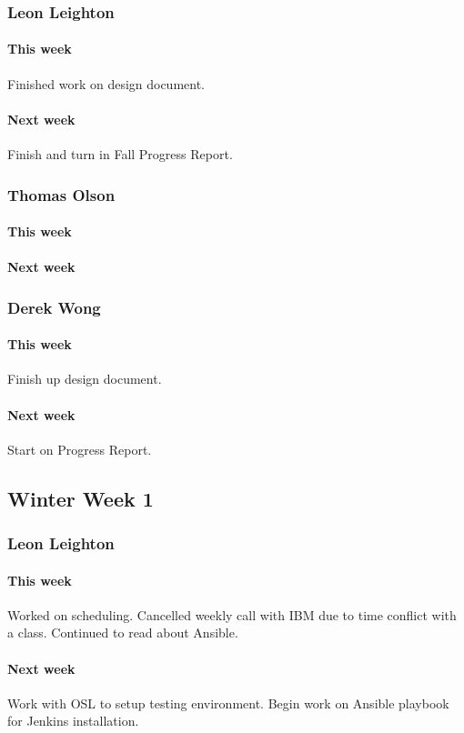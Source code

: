 \documentclass[10pt,letterpaper,onecolumn,draftclsnofoot]{IEEEtran}
\begin{document}
\subsubsection{Leon Leighton}
\paragraph{This week}Finished work on design document.
\paragraph{Next week}Finish and turn in Fall Progress Report.

\subsubsection{Thomas Olson}
\paragraph{This week}
\paragraph{Next week}

\subsubsection{Derek Wong}
\paragraph{This week}Finish up design document.
\paragraph{Next week}Start on Progress Report.

\subsection{Winter Week 1}
\subsubsection{Leon Leighton}
\paragraph{This week}Worked on scheduling. Cancelled weekly call with IBM due to time conflict with a class.  
Continued to read about Ansible.
\paragraph{Next week}Work with OSL to setup testing environment.  
Begin work on Ansible playbook for Jenkins installation.
\end{document}
